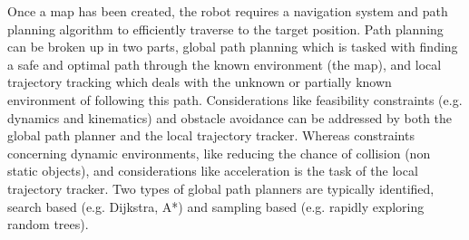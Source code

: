 
Once a map has been created, the robot requires a navigation system and path planning algorithm to efficiently traverse to the target position. Path planning can be broken up in two parts, global path planning which is tasked with finding a safe and optimal path through the known environment (the map)\:\cite{adzhar_review_2020}\cite{liu_path_2023}\cite{muhammad_path_2020}, and local trajectory tracking which deals with the unknown or partially known environment of following this path\:\cite{macenski_desks_2023}\cite{muhammad_path_2020}.
Considerations like feasibility constraints (e.g. dynamics and kinematics) and obstacle avoidance can be addressed by both the global path planner and the local trajectory tracker\:\cite{macenski_desks_2023}. Whereas constraints concerning dynamic environments, like reducing the chance of collision (non static objects), and considerations like acceleration is the task of the local trajectory tracker\:\cite{macenski_desks_2023}\cite{muhammad_path_2020}.
Two types of global path planners are typically identified, search based (e.g. Dijkstra, A*) and sampling based (e.g. rapidly exploring random trees)\:\cite{macenski_desks_2023}.



